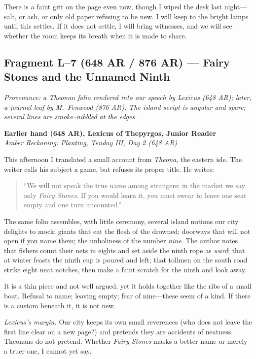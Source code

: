 \documentclass[11pt]{article}
\numberwithin{equation}{section} %
\theoremstyle{plain} %
\theoremstyle{definition} %
\theoremstyle{remark} %
\begin{document}
There is a faint grit on the page even now, though I wiped the desk last night---salt, or ash, or only old paper refusing to be new. I will keep to the bright lamps until this settles. If it does not settle, I will bring witnesses, and we will see whether the room keeps its breath when it is made to share.

\subsection{Fragment L--7 (648 AR / 876 AR) --- Fairy Stones and the Unnamed Ninth}
\label{frag:l7}

\noindent\textit{Provenance: a Theonan folio rendered into our speech by Lexicus (648 AR); later, a journal leaf by M.\ Fenwood (876 AR). The island script is angular and spare; several lines are smoke--nibbled at the edges.}

\medskip
\noindent\textbf{Earlier hand (648 AR), Lexicus of Thepyrgos, Junior Reader}\\
\noindent\textit{Amber Reckoning: Planting, Tenday III, Day 2 (648 AR)}

This afternoon I translated a small account from \textit{Theona}, the eastern isle. The writer calls his subject a game, but refuses its proper title. He writes:

\begin{quote}\small
``We will not speak the true name among strangers; in the market we say only \emph{Fairy Stones}. If you would learn it, you must swear to leave one seat empty and one turn uncounted.''
\end{quote}

The same folio assembles, with little ceremony, several island notions our city delights to mock: giants that eat the flesh of the drowned; doorways that will not open if you name them; the unholiness of the number \textit{nine}. The author notes that fishers count their nets in eights and set aside the ninth rope as \emph{ward}; that at winter feasts the ninth cup is poured and left; that tollmen on the south road strike eight neat notches, then make a faint scratch for the ninth and look away.

It is a thin piece and not well argued, yet it holds together like the ribs of a small boat. Refusal to name; leaving empty; fear of nine---these seem of a kind. If there is a custom beneath it, it is not new.

\medskip
\noindent\textit{Lexicus's margin.} Our city keeps its own small reverences (who does not leave the first line clear on a new page?) and pretends they are accidents of neatness. Theonans do not pretend. Whether \emph{Fairy Stones} masks a better name or merely a truer one, I cannot yet say.
\end{document}
